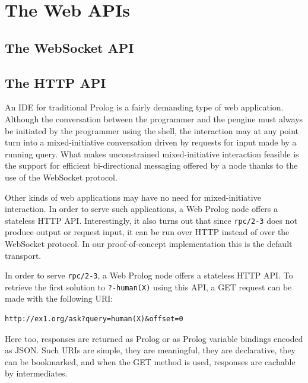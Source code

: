 \documentclass{tlp}
\begin{document}
\section{The Web APIs}

\subsection{The WebSocket API}



\subsection{The HTTP API}

\noindent An IDE for traditional Prolog is a fairly demanding type of web application. Although the conversation between the programmer and the pengine must always be initiated by the programmer using the shell, the interaction may at any point turn into a mixed-initiative conversation driven by requests for input made by a running query. What makes unconstrained mixed-initiative interaction feasible is the support for efficient bi-directional messaging offered by a node thanks to the use of the WebSocket protocol.

Other kinds of web applications may have no need for mixed-initiative interaction. In order to serve such applications, a Web Prolog node offers a stateless HTTP API. Interestingly, it also turns out that since \texttt{rpc/2-3} does not produce output or request input, it can be run over HTTP instead of over the WebSocket protocol. In our proof-of-concept implementation this is the default transport.

In order to serve \texttt{rpc/2-3}, a Web Prolog node offers a stateless HTTP API. To retrieve the first solution to \texttt{?-human(X)} using this API, a GET request can be made with the following URI:

\begin{lstlisting}
http://ex1.org/ask?query=human(X)&offset=0 
\end{lstlisting}

\noindent Here too, responses are returned as Prolog or as Prolog variable bindings encoded as JSON. Such URIs are simple, they are meaningful, they are declarative, they can be bookmarked, and when the GET method is used, responses are cachable by intermediates. 
\end{document}
